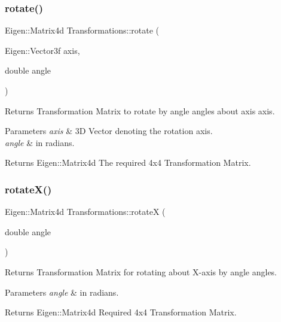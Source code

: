 \subsubsection{\texorpdfstring{rotate()}{rotate()}}
{\footnotesize\ttfamily Eigen\+::\+Matrix4d Transformations\+::rotate (\begin{DoxyParamCaption}\item[{Eigen\+::\+Vector3f}]{axis,  }\item[{double}]{angle }\end{DoxyParamCaption})}



Returns Transformation Matrix to rotate by \textquotesingle{}angle\textquotesingle{} angles about \textquotesingle{}axis\textquotesingle{} axis. 


\begin{DoxyParams}{Parameters}
{\em axis} & 3D Vector denoting the rotation axis. \\
\hline
{\em angle} & in radians. \\
\hline
\end{DoxyParams}
\begin{DoxyReturn}{Returns}
Eigen\+::\+Matrix4d The required 4x4 Transformation Matrix. 
\end{DoxyReturn}
\mbox{\label{classTransformations_a4c54165181c5d5ec5bb7db9e3176c4a7}} 
\subsubsection{\texorpdfstring{rotate\+X()}{rotateX()}}
{\footnotesize\ttfamily Eigen\+::\+Matrix4d Transformations\+::rotateX (\begin{DoxyParamCaption}\item[{double}]{angle }\end{DoxyParamCaption})}



Returns Transformation Matrix for rotating about X-\/axis by \textquotesingle{}angle\textquotesingle{} angles. 


\begin{DoxyParams}{Parameters}
{\em angle} & in radians. \\
\hline
\end{DoxyParams}
\begin{DoxyReturn}{Returns}
Eigen\+::\+Matrix4d Required 4x4 Transformation Matrix. 
\end{DoxyReturn}
\mbox{\label{classTransformations_aa4a1b79a607ba97fa839c7f247ebc4df}} 
